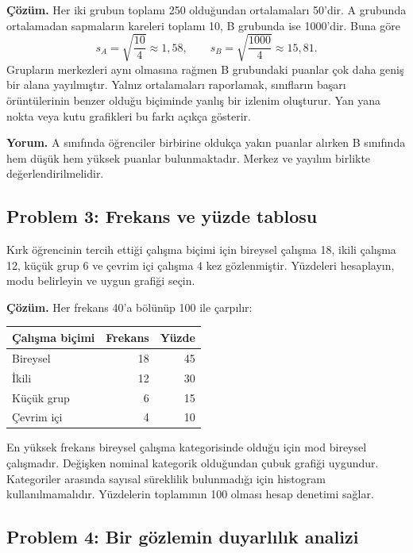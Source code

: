 \textbf{Çözüm.} Her iki grubun toplamı 250 olduğundan ortalamaları 50'dir.
A grubunda ortalamadan sapmaların kareleri toplamı 10, B grubunda ise
1000'dir. Buna göre
\[
s_A=\sqrt{\frac{10}{4}}\approx1{,}58,
\qquad
s_B=\sqrt{\frac{1000}{4}}\approx15{,}81.
\]
Grupların merkezleri aynı olmasına rağmen B grubundaki puanlar çok daha geniş
bir alana yayılmıştır. Yalnız ortalamaları raporlamak, sınıfların başarı
örüntülerinin benzer olduğu biçiminde yanlış bir izlenim oluşturur. Yan yana
nokta veya kutu grafikleri bu farkı açıkça gösterir.

\textbf{Yorum.} A sınıfında öğrenciler birbirine oldukça yakın puanlar
alırken B sınıfında hem düşük hem yüksek puanlar bulunmaktadır. Merkez ve
yayılım birlikte değerlendirilmelidir.

\subsection*{Problem 3: Frekans ve yüzde tablosu}

Kırk öğrencinin tercih ettiği çalışma biçimi için bireysel çalışma 18, ikili
çalışma 12, küçük grup 6 ve çevrim içi çalışma 4 kez gözlenmiştir. Yüzdeleri
hesaplayın, modu belirleyin ve uygun grafiği seçin.

\textbf{Çözüm.} Her frekans 40'a bölünüp 100 ile çarpılır:

\begin{center}
\small
\begin{tabular}{lrr}
\toprule
Çalışma biçimi & Frekans & Yüzde \\
\midrule
Bireysel & 18 & 45 \\
İkili & 12 & 30 \\
Küçük grup & 6 & 15 \\
Çevrim içi & 4 & 10 \\
\bottomrule
\end{tabular}
\end{center}

En yüksek frekans bireysel çalışma kategorisinde olduğu için mod bireysel
çalışmadır. Değişken nominal kategorik olduğundan çubuk grafiği uygundur.
Kategoriler arasında sayısal süreklilik bulunmadığı için histogram
kullanılmamalıdır. Yüzdelerin toplamının 100 olması hesap denetimi sağlar.

\subsection*{Problem 4: Bir gözlemin duyarlılık analizi}

